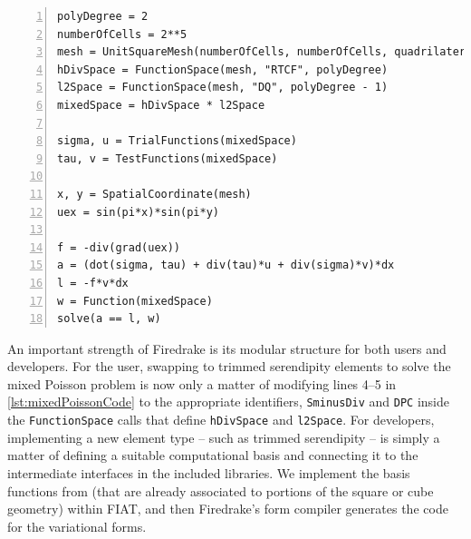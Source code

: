 \documentclass[format=acmsmall,screen,timestamp=false,a4paper]{acmart}
\newcommand\akg[1]{\textbf{\textcolor[rgb]{.5,0,1}{[Andrew: #1]}}}
\newcommand\josh[1]{\textbf{\textcolor[rgb]{0,.5,1}{[Josh: #1]}}}
\begin{document}
  
\begin{lstlisting}[float=htpb,caption={Basic Firedrake implementation of the mixed Poisson problem showcasing where to choose the elements that are used and how to create the equations in Firedrake's notation.}, label={lst:mixedPoissonCode}, numbers=left, firstnumber=1, xleftmargin=20pt,  xrightmargin=20pt]
polyDegree = 2
numberOfCells = 2**5
mesh = UnitSquareMesh(numberOfCells, numberOfCells, quadrilateral=True)
hDivSpace = FunctionSpace(mesh, "RTCF", polyDegree)
l2Space = FunctionSpace(mesh, "DQ", polyDegree - 1)
mixedSpace = hDivSpace * l2Space

sigma, u = TrialFunctions(mixedSpace)
tau, v = TestFunctions(mixedSpace)

x, y = SpatialCoordinate(mesh)
uex = sin(pi*x)*sin(pi*y)

f = -div(grad(uex))
a = (dot(sigma, tau) + div(tau)*u + div(sigma)*v)*dx
l = -f*v*dx
w = Function(mixedSpace)
solve(a == l, w)
\end{lstlisting}


  
  
An important strength of Firedrake is its modular structure for both users and developers.
For the user, swapping to trimmed serendipity elements to solve the mixed Poisson problem is now only a matter of modifying lines 4--5 in \cref{lst:mixedPoissonCode} to the appropriate identifiers, \texttt{SminusDiv} and \texttt{DPC} inside the \texttt{FunctionSpace} calls that define \texttt{hDivSpace} and \texttt{l2Space}.
   For developers, implementing a new element type -- such as trimmed serendipity -- is simply a matter of defining a suitable computational basis and connecting it to the intermediate interfaces in the included libraries.  We implement the basis functions from \citet{gillette2019computational} (that are already associated to portions of the square or cube geometry) within FIAT, and then Firedrake's form compiler generates the code for the variational forms.
   
\end{document}
